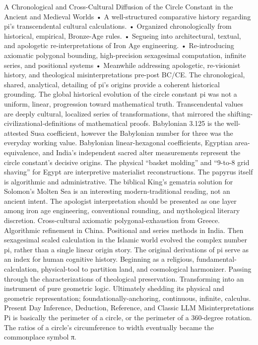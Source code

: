 {A Chronological and Cross-Cultural Diffusion of the Circle Constant in the Ancient and Medieval Worlds
•	A well-structured comparative history regarding pi’s transcendental cultural calculations. 
•	Organized chronologically from historical, empirical, Bronze-Age rules. 
•	Segueing into architectural, textual, and apologetic re-interpretations of Iron Age engineering. 
•	Re-introducing axiomatic polygonal bounding, high-precision sexagesimal computation, infinite series, and positional systems
•	Meanwhile addressing apologetic, re-visionist history, and theological misinterpretations pre-post BC/CE. 
The chronological, shared, analytical, detailing of pi’s origins provide a coherent historical grounding. The global historical evolution of the circle constant pi was not a uniform, linear, progression toward mathematical truth. Transcendental values are deeply cultural, localized series of transformations, that mirrored the shifting-civilizational-definitions of mathematical proofs. Babylonian 3.125 is the well-attested Susa coefficient, however the Babylonian number for three was the everyday working value. Babylonian linear-hexagonal coefficients, Egyptian area-equivalence, and India’s independent sacred alter measurements represent the circle constant’s decisive origins. The physical “basket molding” and “9-to-8 grid shaving” for Egypt are interpretive materialist reconstructions. The papyrus itself is algorithmic and administrative. The biblical King’s gematria solution for Solomon’s Molten Sea is an interesting modern-traditional reading, not an ancient intent. The apologist interpretation should be presented as one layer among iron age engineering, conventional rounding, and mythological literary discretion. Cross-cultural axiomatic polygonal-exhaustion from Greece. Algorithmic refinement in China. Positional and series methods in India. Then sexagesimal scaled calculation in the Islamic world evolved the complex number pi, rather than a single linear origin story. 
The original derivations of pi serve as an index for human cognitive history. Beginning as a religious, fundamental-calculation, physical-tool to partition land, and cosmological harmonizer. Passing through the characterizations of theological preservation. Transforming into an instrument of pure geometric logic. Ultimately shedding its physical and geometric representation; foundationally-anchoring, continuous, infinite, calculus.
Present Day Inference, Deduction, Reference, and Classic LLM Misinterpretations
Pi is basically the perimeter of a circle, or the perimeter of a 360-degree rotation. The ratios of a circle’s circumference to width eventually became the commonplace symbol π.
}
